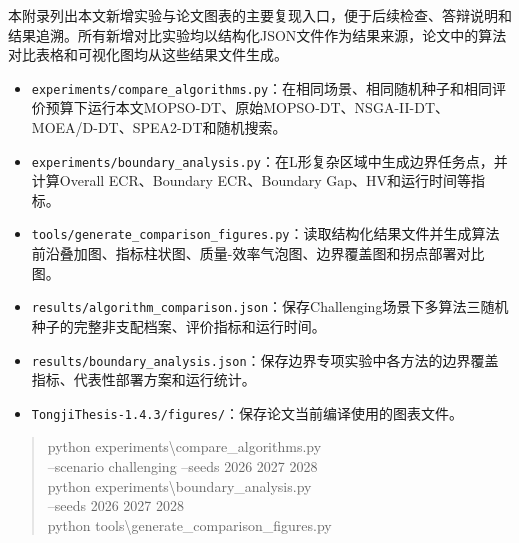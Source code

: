 ﻿\label{sec:appendix-reproducibility}

本附录列出本文新增实验与论文图表的主要复现入口，便于后续检查、答辩说明和结果追溯。所有新增对比实验均以结构化JSON文件作为结果来源，论文中的算法对比表格和可视化图均从这些结果文件生成。


\begin{itemize}
  \item \texttt{experiments/compare\_algorithms.py}：在相同场景、相同随机种子和相同评价预算下运行本文MOPSO-DT、原始MOPSO-DT、NSGA-II-DT、MOEA/D-DT、SPEA2-DT和随机搜索。
  \item \texttt{experiments/boundary\_analysis.py}：在L形复杂区域中生成边界任务点，并计算Overall ECR、Boundary ECR、Boundary Gap、HV和运行时间等指标。
  \item \texttt{tools/generate\_comparison\_figures.py}：读取结构化结果文件并生成算法前沿叠加图、指标柱状图、质量-效率气泡图、边界覆盖图和拐点部署对比图。
\end{itemize}


\begin{itemize}
  \item \texttt{results/algorithm\_comparison.json}：保存Challenging场景下多算法三随机种子的完整非支配档案、评价指标和运行时间。
  \item \texttt{results/boundary\_analysis.json}：保存边界专项实验中各方法的边界覆盖指标、代表性部署方案和运行统计。
  \item \texttt{TongjiThesis-1.4.3/figures/}：保存论文当前编译使用的图表文件。
\end{itemize}


\begin{quote}
\small\ttfamily\raggedright
python experiments\textbackslash compare\_algorithms.py\\
\hspace*{1em}--scenario challenging --seeds 2026 2027 2028\\[2pt]
python experiments\textbackslash boundary\_analysis.py\\
\hspace*{1em}--seeds 2026 2027 2028\\[2pt]
python tools\textbackslash generate\_comparison\_figures.py
\end{quote}
